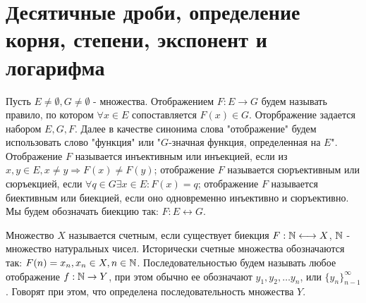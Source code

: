 \documentclass[main]{subfiles}
\begin{document}
\section{Десятичные дроби, определение корня, степени,
экспонент и логарифма}
\begin{definition}
    Пусть $E \neq \emptyset, G \neq \emptyset$ - множества. Отображением
    $F: E \rightarrow G$ будем называть правило, по котором $\forall x \in E$
    сопоставляется $F(x) \in G$. Оторбражение задается набором $E, G, F$.
    Далее в качестве синонима слова "отображение" будем использовать слово
    "функция" или "$G$-значная функция, определенная на $E$".
    Отображение $F$ называется инъективным или инъекцией, если из $x, y \in E,
    x \neq y \Rightarrow F(x) \neq F(y)$;
    отображение $F$ называется сюръективным или сюръекцией, если $\forall q 
    \in G \exists x \in E : F(x) = q$;
    отображение $F$ называется биективным или биекцией, если оно одновременно
    инъективно и сюръективно. Мы будем обозначать биекцию так: 
    $F: E \longleftrightarrow G$.
\end{definition}
\begin{definition}
    Множество $X$ называется счетным, если существует биекция 
    $F: \mathbb{N} \longleftrightarrow X$, $\mathbb{N}$ - множество натуральных чисел.
    Исторически счетные множества обозначаются так: $F(n) = x_n, x_n \in X,
    n \in \mathbb{N}$. Последовательностью будем называть любое отображение 
    $f: \mathbb{N} \rightarrow Y$, при этом обычно ее обозначают $y_1, y_2, \ldots
    y_n$, или $\{y_n\}_{n-1}^{\infty}$. Говорят при этом, что определена 
    последовательность множества $Y$.
\end{definition}
\end{document}
